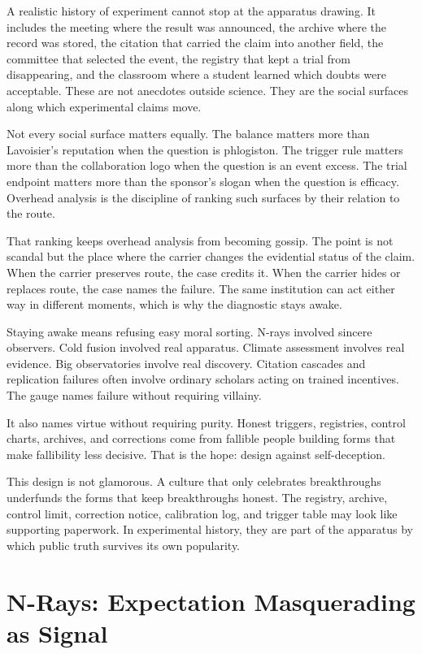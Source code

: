\begin{chapteressay}
A realistic history of experiment cannot stop at the apparatus drawing.
It includes the meeting where the result was announced, the archive where
the record was stored, the citation that carried the claim into another
field, the committee that selected the event, the registry that kept a
trial from disappearing, and the classroom where a student learned which
doubts were acceptable. These are not anecdotes outside science. They are
the social surfaces along which experimental claims move.

Not every social surface matters equally. The balance matters more than
Lavoisier's reputation when the question is phlogiston. The trigger rule
matters more than the collaboration logo when the question is an event
excess. The trial endpoint matters more than the sponsor's slogan when
the question is efficacy. Overhead analysis is the discipline of ranking
such surfaces by their relation to the route.

That ranking keeps overhead analysis from becoming gossip. The point is
not scandal but the place where the carrier changes the evidential status
of the claim. When the carrier preserves route, the case credits it. When
the carrier hides or replaces route, the case names the failure. The same
institution can act either way in different moments, which is why the
diagnostic stays awake.

Staying awake means refusing easy moral sorting. N-rays involved sincere
observers. Cold fusion involved real apparatus. Climate assessment involves
real evidence. Big observatories involve real discovery. Citation cascades
and replication failures often involve ordinary scholars acting on trained
incentives. The gauge names failure without requiring villainy.

It also names virtue without requiring purity. Honest triggers, registries,
control charts, archives, and corrections come from fallible people building
forms that make fallibility less decisive. That is the hope: design against
self-deception.

This design is not glamorous. A culture that only celebrates breakthroughs
underfunds the forms that keep breakthroughs honest. The registry, archive, control
limit, correction notice, calibration log, and trigger table may look like
supporting paperwork. In experimental history, they are part of the
apparatus by which public truth survives its own popularity.
\end{chapteressay}

\section{N-Rays: Expectation Masquerading as Signal}


